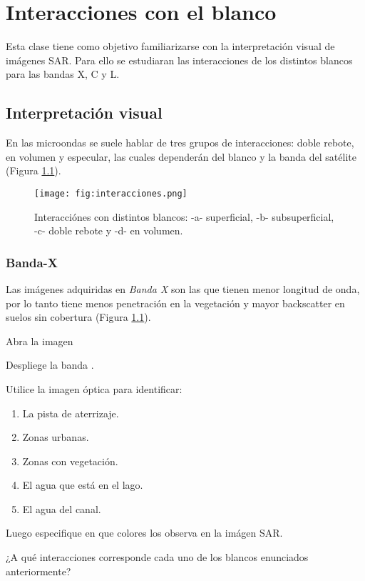 \chapter{Interacciones con el blanco}

Esta clase tiene como objetivo familiarizarse con la interpretación visual de imágenes SAR. Para ello se estudiaran las interacciones de los distintos blancos para las bandas X, C y L.

\section{Interpretación visual}

En las microondas se suele hablar de tres grupos de interacciones: doble rebote, en volumen y especular, las cuales dependerán del blanco y la banda del satélite (Figura \ref{fig:interacciones}).

\begin{figure}[h!]
    \centering
    \texttt{[image: fig:interacciones.png]}
    \caption{Interacciónes con distintos blancos: -a- superficial, -b- subsuperficial, -c- doble rebote y -d- en volumen.}
    \label{fig:interacciones}
\end{figure}

\subsection{Banda-X}

Las imágenes adquiridas en \emph{Banda X} son las que tienen menor longitud de onda, por lo tanto tiene menos penetración en la vegetación y mayor backscatter en suelos sin cobertura (Figura \ref{fig:interacciones}).


Abra la imagen
\begin{center}
\end{center}
Despliege la banda .

Utilice la imagen óptica para identificar:

\begin{enumerate}
    \item La pista de aterrizaje.
    \item Zonas urbanas.
    \item Zonas con vegetación.
    \item El agua que está en el lago.
    \item El agua del canal.
\end{enumerate}
Luego especifique en que colores los observa en la imágen SAR.
\begin{que}
    ¿A qué interacciones corresponde cada uno de los blancos enunciados anteriormente?
\end{que}

